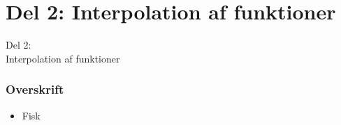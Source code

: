 \section{Del 2: Interpolation af funktioner}
\begin{frame}
\centering
\Huge
Del 2: \\
Interpolation af funktioner
\end{frame}
%
\begin{frame}
\frametitle{Overskrift}
\begin{itemize}
\item Fisk
\end{itemize}
\end{frame}
